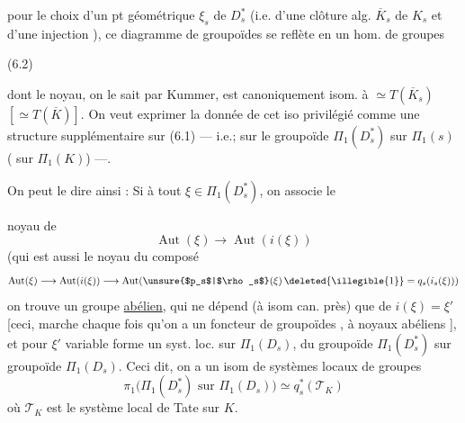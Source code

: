 pour le choix d'un pt géométrique $\xi_s$ de $D_s^*$
 (i.e. d'une clôture alg.
$\overline K_s$ de $K_s$ et d'une injection
),
ce diagramme de groupoïdes se reflète en un hom. de groupes

(6.2)


dont le noyau, on le sait par Kummer, est canoniquement isom. à
$\simeq T(\overline K_s)$ $[\simeq T(\overline K)]$.
On veut exprimer la donnée de cet iso privilégié comme une structure
supplémentaire sur (6.1) --- 
i.e.; sur le groupoïde $\Pi_1(D_s^*)$ sur $\Pi_1(s)$
( sur $\Pi_1(K)$) ---.

On peut le dire ainsi :  Si à tout
\deleted{\unsure{$\xi$}} $\xi\in\Pi_1(D_s^*)$, on associe le


noyau de
\[
\operatorname{Aut}(\xi)\longrightarrow\operatorname{Aut}(i(\xi))
\]
(qui est aussi le noyau du composé
\[
\operatorname{Aut}(\xi)\longrightarrow\operatorname{Aut}(i(\xi))
\longrightarrow
\operatorname{Aut}(\text{\unsure{$p_s$|$\rho_s$}}(\xi)\,
\text{\deleted{\illegible{1}}}=q_s(i_s(\xi)))
\]
on trouve un groupe \uline{abélien}, qui ne dépend (à isom can. près)
que  de $i(\xi)=\xi'$
[ceci, 
marche chaque fois qu'on a
un foncteur
 de groupoïdes ,
à noyaux abéliens ],
et pour $\xi'$ variable forme un syst. loc. sur $\Pi_1(D_s)$,
du groupoïde $\Pi_1(D_s^*)$ sur  groupoïde
$\Pi_1(D_s)$. Ceci dit, on a un isom de systèmes locaux de groupes
\[
\pi_1\bigl(\Pi_1(D_s^*)\text{ sur }\Pi_1(D_s)\bigr)
\simeq q_s^*(\mathcal T_K)
\]
où $\mathcal T_K$ est le système local de Tate sur $K$.

